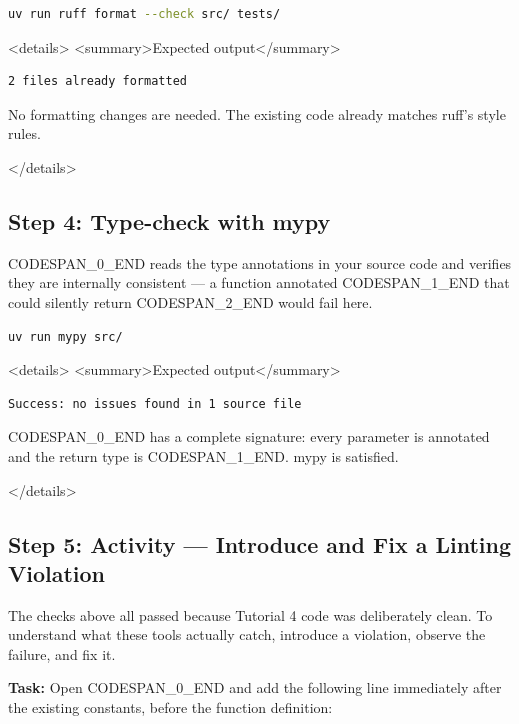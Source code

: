 \documentclass[11pt,a4paper]{book}
\begin{document}
\begin{lstlisting}[language=Bash]
uv run ruff format --check src/ tests/
\end{lstlisting}

<details>
<summary>Expected output</summary>

\begin{lstlisting}
2 files already formatted
\end{lstlisting}

No formatting changes are needed. The existing code already matches ruff's style rules.

</details>

\medskip

\subsection{Step 4: Type-check with mypy}

CODESPAN\_0\_END reads the type annotations in your source code and verifies they are internally consistent --- a function annotated CODESPAN\_1\_END that could silently return CODESPAN\_2\_END would fail here.

\begin{lstlisting}[language=Bash]
uv run mypy src/
\end{lstlisting}

<details>
<summary>Expected output</summary>

\begin{lstlisting}
Success: no issues found in 1 source file
\end{lstlisting}

CODESPAN\_0\_END has a complete signature: every parameter is annotated and the return type is CODESPAN\_1\_END. mypy is satisfied.

</details>

\medskip

\subsection{Step 5: Activity --- Introduce and Fix a Linting Violation}

The checks above all passed because Tutorial 4 code was deliberately clean. To understand what these tools actually catch, introduce a violation, observe the failure, and fix it.

\textbf{Task:} Open CODESPAN\_0\_END and add the following line immediately after the existing constants, before the function definition:
\end{document}
